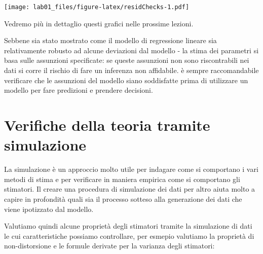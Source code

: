 \documentclass[
]{article}
\begin{document}
\texttt{[image: lab01\_files/figure-latex/residChecks-1.pdf]}

Vedremo più in dettaglio questi grafici nelle prossime lezioni.

Sebbene sia stato mostrato come il modello di regressione lineare sia
relativamente robusto ad alcune deviazioni dal modello - la stima dei
parametri si basa sulle assunzioni specificate: se queste assunzioni non
sono riscontrabili nei dati si corre il rischio di fare un inferenza non
affidabile. è sempre raccomandabile verificare che le assunzioni del
modello siano soddisfatte prima di utilizzare un modello per fare
predizioni e prendere decisioni.

\hypertarget{verifiche-della-teoria-tramite-simulazione}{%
\section{Verifiche della teoria tramite
simulazione}\label{verifiche-della-teoria-tramite-simulazione}}

La simulazione è un approccio molto utile per indagare come si
comportano i vari metodi di stima e per verificare in maniera empirica
come si comportano gli stimatori. Il creare una procedura di simulazione
dei dati per altro aiuta molto a capire in profondità quali sia il
processo sotteso alla generazione dei dati che viene ipotizzato dal
modello.

Valutiamo quindi alcune proprietà degli stimatori tramite la simulazione
di dati le cui caratteristiche possiamo controllare, per esmepio
valutiamo la proprietà di non-distorsione e le formule derivate per la
varianza degli stimatori:
\end{document}

